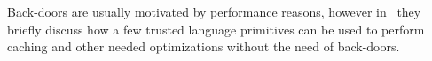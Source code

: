Back-doors are usually motivated by performance reasons, however in~\cite{GordonEtAl12} they
briefly discuss how a few trusted language primitives can be used to perform caching and other needed optimizations
without the need of back-doors.
%
%
%
%
